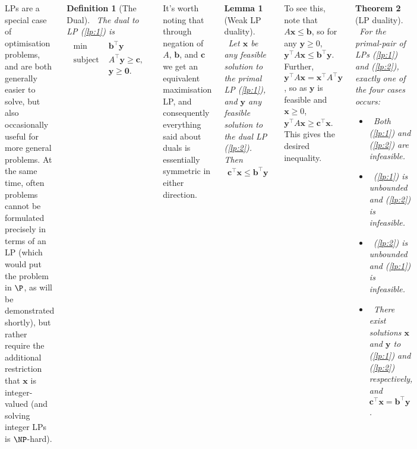 \documentclass{tikzposter} %
\newtheorem{theorem}{Theorem}
\newtheorem{lemma}[theorem]{Lemma}
\newtheorem{definition}{Definition}
\begin{document}
\begin{columns}
{  LPs are a special case of optimisation problems, and are both generally easier to solve, but also occasionally useful for more general problems. At the same time, often problems cannot be formulated precisely in terms of an LP (which would put the problem in $\P$, as will be demonstrated shortly), but rather require the additional restriction that $\bm{x}$ is integer-valued (and solving integer LPs is $\NP$-hard). \\

    \begin{definition}[The Dual]
    \ The dual to LP (\ref{lp:1}) is
    \begin{align}
      \begin{split}
      \min\,\,&\bm{b}^{\top} \bm{y} \\
      \text{subject to } &A^{\top}\bm{y} \ge \bm{c}, \\
      &\bm{y} \ge \bm{0}.
      \end{split}\label{lp:2}
    \end{align}
    \end{definition}
    \hphantom{}

    It's worth noting that through negation of $A$, $\bm{b}$, and $\bm{c}$ we get an equivalent maximisation LP, and consequently everything said about duals is essentially symmetric in either direction. \\

    \begin{lemma}[Weak LP duality]
      \ Let $\bm{x}$ be any feasible solution to the primal LP (\ref{lp:1}), and $\bm{y}$ any feasible solution to the dual LP (\ref{lp:2}). Then
      \begin{align*}
        \bm{c}^{\top}\bm{x} \le \bm{b}^{\top}\bm{y}
      \end{align*}
    \end{lemma}
    \hphantom{}

    To see this, note that $A\bm{x} \le \bm{b}$, so for any $\bm{y} \ge 0$, $\bm{y}^{\top}A\bm{x} \le \bm{b}^{\top}\bm{y}$. Further, $\bm{y}^{\top}A\bm{x} = \bm{x}^{\top}A^{\top}\bm{y}$, so as $\bm{y}$ is feasible and $\bm{x} \ge 0$, $\bm{y}^{\top}A\bm{x} \ge \bm{c}^{\top}\bm{x}$. This gives the desired inequality. \\

    \begin{theorem}[LP duality]
      \ For the primal-pair of LPs (\ref{lp:1}) and (\ref{lp:2}), exactly one of the four cases occurs:
      \begin{itemize}
              \item \ Both (\ref{lp:1}) and (\ref{lp:2}) are infeasible.
              \item \ (\ref{lp:1}) is unbounded and (\ref{lp:2}) is infeasible.
              \item \ (\ref{lp:2}) is unbounded and (\ref{lp:1}) is infeasible.
              \item \ There exist solutions $\bm{x}$ and $\bm{y}$ to (\ref{lp:1}) and (\ref{lp:2}) respectively, and $\bm{c}^{\top}\bm{x} = \bm{b}^{\top}\bm{y}$.
      \end{itemize}
    \end{theorem}
    \hphantom{}

}
\end{columns}
\end{document}
